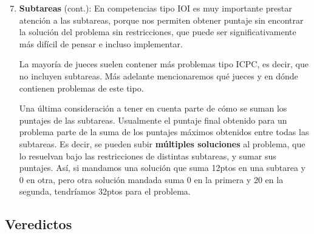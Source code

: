 \documentclass{beamer}
\begin{document}
    \begin{frame}[noframenumbering]
        \begin{enumerate}
            \setcounter{enumi}{6}
            \item \textbf{Subtareas} (cont.): En competencias tipo IOI es muy importante prestar atención a las subtareas, porque nos permiten obtener puntaje sin encontrar la solución del problema sin restricciones, que puede ser significativamente más difícil de pensar e incluso implementar. \pause \vspace{4pt}

            La mayoría de jueces suelen contener más problemas tipo ICPC, es decir, que no incluyen subtareas. Más adelante mencionaremos qué jueces y en dónde contienen problemas de este tipo. \pause \vspace{4pt}

            Una última consideración a tener en cuenta parte de cómo se suman los puntajes de las subtareas. \pause Usualmente el puntaje final obtenido para un problema parte de la suma de los puntajes máximos obtenidos entre todas las subtareas. Es decir, se pueden subir \textbf{múltiples soluciones} al problema, que lo resuelvan bajo las restricciones de distintas subtareas, y sumar sus puntajes. \pause Así, si mandamos una solución que suma 12ptos en una subtarea y 0 en otra, pero otra solución mandada suma 0 en la primera y 20 en la segunda, tendríamos 32ptos para el problema.
        \end{enumerate}
    \end{frame}

    \subsection{Veredictos}
    \begin{frame}
    \end{frame}
\end{document}
